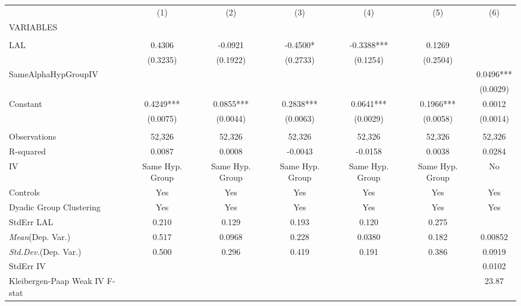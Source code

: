 \documentclass[]{article}
\begin{document}
\begin{tabular}{lcccccc} \hline
 & (1) & (2) & (3) & (4) & (5) & (6) \\
VARIABLES &  &  &  &  &  &  \\ \hline
 &  &  &  &  &  &  \\
LAL & 0.4306 & -0.0921 & -0.4500* & -0.3388*** & 0.1269 &  \\
 & (0.3235) & (0.1922) & (0.2733) & (0.1254) & (0.2504) &  \\
SameAlphaHypGroupIV &  &  &  &  &  & 0.0496*** \\
 &  &  &  &  &  & (0.0029) \\
Constant & 0.4249*** & 0.0855*** & 0.2838*** & 0.0641*** & 0.1966*** & 0.0012 \\
 & (0.0075) & (0.0044) & (0.0063) & (0.0029) & (0.0058) & (0.0014) \\
 &  &  &  &  &  &  \\
Observations & 52,326 & 52,326 & 52,326 & 52,326 & 52,326 & 52,326 \\
R-squared & 0.0087 & 0.0008 & -0.0043 & -0.0158 & 0.0038 & 0.0284 \\
IV & Same Hyp. Group & Same Hyp. Group & Same Hyp. Group & Same Hyp. Group & Same Hyp. Group & No \\
Controls & Yes & Yes & Yes & Yes & Yes & Yes \\
Dyadic Group Clustering & Yes & Yes & Yes & Yes & Yes & Yes \\
StdErr LAL & 0.210 & 0.129 & 0.193 & 0.120 & 0.275 &  \\
\textit{Mean}(Dep. Var.) & 0.517 & 0.0968 & 0.228 & 0.0380 & 0.182 & 0.00852 \\
\textit{Std.Dev.}(Dep. Var.) & 0.500 & 0.296 & 0.419 & 0.191 & 0.386 & 0.0919 \\
StdErr IV &  &  &  &  &  & 0.0102 \\
 Kleibergen-Paap Weak IV F-stat &  &  &  &  &  & 23.87 \\ \hline
\end{tabular}
\end{document}
